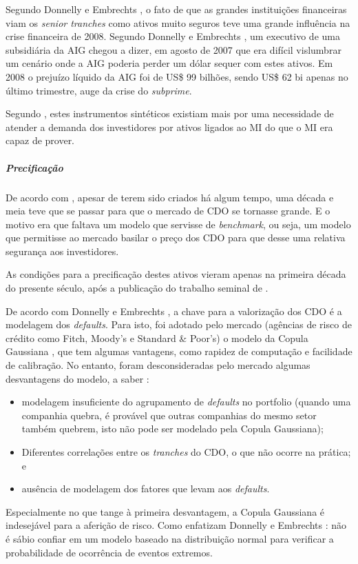 \documentclass[
	12pt,				%
	oneside,			%
	a4paper,			%
	chapter=TITLE,		%
	section=TITLE,		%
	english,			%
	brazil				%
	]{abntex2}
\begin{document}
\begin{refsection}
Segundo Donnelly e Embrechts \autocite[7]{devil}, o fato de que as grandes instituições
financeiras viam os \emph{senior tranches} como ativos muito seguros teve uma grande
influência na crise financeira de 2008. Segundo Donnelly e Embrechts
\autocite[24]{devil}, um executivo de uma subsidiária da AIG chegou a dizer, em agosto
de 2007 que era difícil vislumbrar um cenário onde a AIG poderia perder um dólar
sequer com estes ativos. Em 2008 o prejuízo líquido da AIG foi de
US\$ 99 bilhões, sendo US\$ 62 bi apenas no último trimestre, auge da crise do
\emph{subprime}.

Segundo \textcite[p.~262]{simkovic}, estes instrumentos sintéticos existiam mais por uma
necessidade de atender a demanda dos investidores por ativos ligados ao \gls{MI}
do que o \gls{MI} era capaz de prover.

\hypertarget{precificauxe7uxe3o}{%
\subparagraph{Precificação}\label{precificauxe7uxe3o}}

De acordo com \textcite{watts}, apesar de terem sido criados há algum tempo, uma década e
meia teve que se passar para que o mercado de \gls{CDO} se tornasse grande. E o
motivo era que faltava um modelo que servisse de \emph{benchmark}, ou seja, um modelo
que permitisse ao mercado basilar o preço dos \gls{CDO} para que desse uma
relativa segurança aos investidores.

As condições para a precificação destes ativos vieram apenas na primeira década
do presente século, após a publicação do trabalho seminal de \textcite{Li}.

De acordo com Donnelly e Embrechts \autocite*[7]{devil}, a chave para a valorização dos
\gls{CDO} é a modelagem dos \emph{defaults}. Para isto, foi adotado pelo mercado
(agências de risco de crédito como Fitch, Moody's e Standard \& Poor's) o modelo
da Copula Gaussiana \autocite[14]{devil}, que tem algumas vantagens, como rapidez de
computação e facilidade de calibração. No entanto, foram desconsideradas pelo
mercado algumas desvantagens do modelo, a saber \autocite[15]{devil}:
\begin{itemize}
\tightlist
\item
  modelagem insuficiente do agrupamento de \emph{defaults} no portfolio (quando uma
  companhia quebra, é provável que outras companhias do mesmo setor também quebrem,
  isto não pode ser modelado pela Copula Gaussiana);
\item
  Diferentes correlações entre os \emph{tranches} do CDO, o que não ocorre na
  prática; e
\item
  ausência de modelagem dos fatores que levam aos \emph{defaults}.
\end{itemize}
Especialmente no que tange à primeira desvantagem, a Copula Gaussiana é
indesejável para a aferição de risco. Como enfatizam Donnelly e Embrechts
\autocite*[16]{devil}: não é sábio confiar em um modelo baseado na distribuição normal
para verificar a probabilidade de ocorrência de eventos extremos.


\end{refsection}
\end{document}
